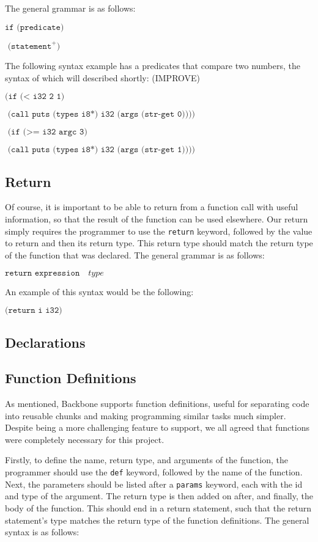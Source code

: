 \documentclass[journal=jacsat, manuscript=article]{achemso}
\begin{document}
The general grammar is as follows:

$\texttt{if (predicate)}$

$\texttt{    (statement}^+\texttt{)}$

The following syntax example has a predicates that compare two numbers, the syntax of which will described shortly: (IMPROVE)

$\texttt{(if (< i32 2 1)}$

$\texttt{     (call puts (types i8*) i32 (args (str-get 0))))}$

$\texttt{  (if (>= i32 argc 3)}$

$\texttt{     (call puts (types i8*) i32 (args (str-get 1))))}$

\subsection{Return}

Of course, it is important to be able to return from a function call with useful information, so that the result of the function can be used elsewhere.
Our return simply requires the programmer to use the \texttt{return} keyword, followed by the value to return and then its return type. This return type should match the return type of the function that was declared.
The general grammar is as follows:

$\texttt{return expression}\quad type$

An example of this syntax would be the following:

$\texttt{(return i i32)}$

\subsection{Declarations}
\subsection{Function Definitions}

As mentioned, Backbone supports function definitions, useful for separating code into reusable chunks and making programming similar tasks much simpler. Despite being a more challenging feature to support, we all agreed that functions were completely necessary for this project. 

Firstly, to define the name, return type, and arguments of the function, the programmer should use the \texttt{def} keyword, followed by the name of the function. Next, the parameters should be listed after a \texttt{params} keyword, each with the id and type of the argument. The return type is then added on after, and finally, the body of the function. This should end in a return statement, such that the return statement's type matches the return type of the function definitions.
The general syntax is as follows:
\end{document}
